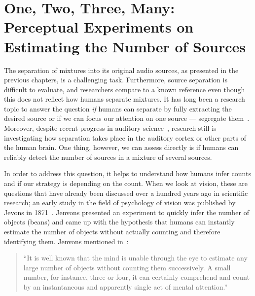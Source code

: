 \chapter[Experiments on Estimating the Number of Sources]{One, Two, Three, Many: Perceptual Experiments on Estimating the Number of Sources}
\label{cha:countanalysis}
\bigskip
\bigskip
\bigskip
\bigskip
%
The separation of mixtures into its original audio sources, as presented in the previous chapters, is a challenging task.
Furthermore, source separation is difficult to evaluate, and researchers compare to a known reference even though this does not reflect how humans separate mixtures.
It has long been a research topic to answer the question \emph{if} humans can separate by fully extracting the desired source or if we can focus our attention on one source --- segregate them~\cite{bregman90}.
Moreover, despite recent progress in auditory science~\cite{carlyon04, koelsch05, rabinowitz13}, research still is investigating how separation takes place in the auditory cortex or other parts of the human brain.
One thing, however, we can assess directly is if humans can reliably detect the number of sources in a mixture of several sources.
\par
In order to address this question, it helps to understand how humans infer counts and if our strategy is depending on the count.
When we look at vision, these are questions that have already been discussed over a hundred years ago in scientific research; an early study in the field of psychology of vision was published by Jevons in 1871~\cite{jevons1871}.
Jenvons presented an experiment to quickly infer the number of objects (beans) and came up with the hypothesis that humans can instantly estimate the number of objects without actually counting and therefore identifying them.
Jenvons mentioned in~\cite{jevons1871}:

\begin{quote}
``It is well known that the mind is unable through the eye to estimate any large number of objects without counting them successively. A small number, for instance, three or four, it can certainly comprehend and count by an instantaneous and apparently single act of mental attention.''
\end{quote}

